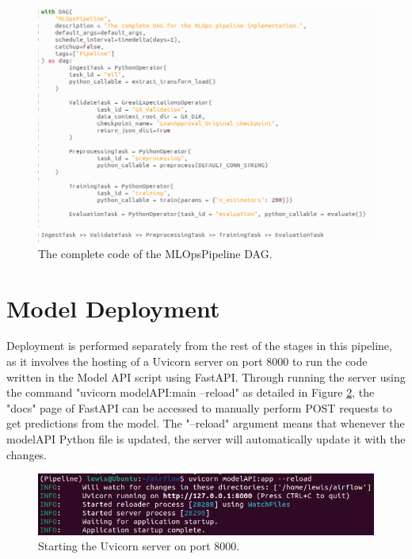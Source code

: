 \documentclass[12pt]{report}
\begin{document}
\begin{figure}[H]
    \centering
    \includegraphics[width=\linewidth]{Implementation/.Code/PipelineDAG.png}
    \caption{The complete code of the MLOpsPipeline DAG.}
    \label{fig:PipelineDAGCode}
\end{figure}


\section{Model Deployment}\label{sec:ImpDeployment}
Deployment is performed separately from the rest of the stages in this pipeline, 
as it involves the hosting of a Uvicorn server on port 8000 to run the code written 
in the Model API script using FastAPI. Through running the server using the command 
"uvicorn modelAPI:main --reload" as detailed in Figure 
\ref{fig:UviStartup}, the "docs" page of FastAPI can be accessed to manually perform POST 
requests to get predictions from the model. The "--reload" argument means that whenever the 
modelAPI Python file is updated, the server will automatically update it with the changes.

\begin{figure}[H]
    \centering
    \includegraphics[width=\linewidth]{Implementation/FastAPI+Uvi/Startup.png}
    \caption{Starting the Uvicorn server on port 8000.}
    \label{fig:UviStartup}
\end{figure}
\end{document}
